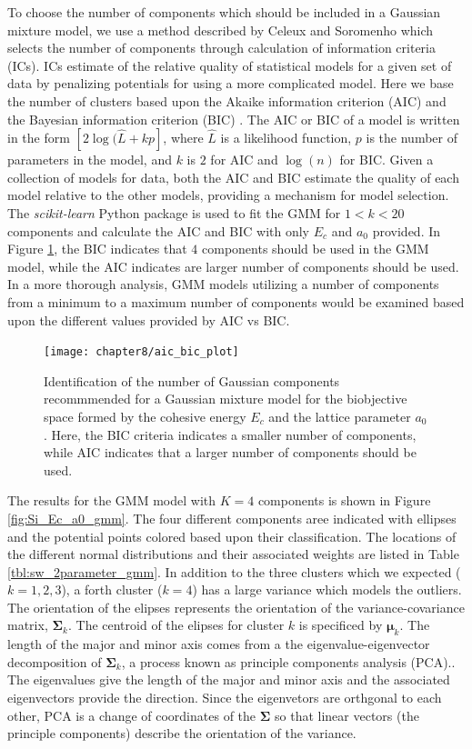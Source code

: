 To choose the number of components which should be included in a Gaussian mixture model, we use a method described by Celeux and Soromenho\cite{celeux1996_gmm_components} which selects the number of components through calculation of information criteria (ICs).  ICs estimate of the relative quality of statistical models for a given set of data by penalizing potentials for using a more complicated model.
Here we base the number of clusters based upon the Akaike information criterion (AIC)\cite{akaike1998_aic} and the Bayesian information criterion (BIC) \cite{schwarz1978_bic}.
The AIC or BIC of a model is written in the form $[2\log(\hat{L}+kp]$, where $\hat{L}$ is a likelihood function, $p$ is the number of parameters in the model, and $k$ is $2$ for AIC and $\log(n)$ for BIC.
Given a collection of models for data, both the AIC and BIC estimate the quality of each model relative to the other models, providing a mechanism for model selection.
The \emph{scikit-learn} Python package\cite{pedregosa2011_scikitlearn} is used to fit the GMM for $1 < k < 20$ components and calculate the AIC and BIC with only $E_c$ and $a_0$ provided.
In Figure \ref{fig:Si_Ec_a0_aic_bic}, the BIC indicates that $4$ components should be used in the GMM model, while the AIC indicates are larger number of components should be used.
In a more thorough analysis, GMM models utilizing a number of components from a minimum to a maximum number of components would be examined based upon the different values provided by AIC vs BIC.
\begin{figure}[ht]
	\centering
	\texttt{[image: chapter8/aic\_bic\_plot]}
	\caption{Identification of the number of Gaussian components recommmended for a Gaussian mixture model for the biobjective space formed by the cohesive energy $E_c$ and the lattice parameter $a_0$.  Here, the BIC criteria indicates a smaller number of components, while AIC indicates that a larger number of components should be used.}
	\label{fig:Si_Ec_a0_aic_bic}
\end{figure}

The results for the GMM model with $K=4$ components is shown in Figure \ref{fig:Si_Ec_a0_gmm}.  The four different components aree indicated with ellipses and the potential points colored based upon their classification.  The locations of the different normal distributions and their associated weights are listed in Table \ref{tbl:sw_2parameter_gmm}.  In addition to the three clusters which we expected ($k=1,2,3$), a forth cluster ($k=4$) has a large variance which models the outliers.  The orientation of the elipses represents the orientation of the variance-covariance matrix, $\bm{\Sigma}_k$.
The centroid of the elipses for cluster $k$ is specificed by $\bm{\mu}_k$.  The length of the major and minor axis comes from a the eigenvalue-eigenvector decomposition of $\bm{\Sigma}_k$, a process known as principle components analysis (PCA).\cite{pearson1901_pca,hotelling1933_pca}.  The eigenvalues give the length of the major and minor axis and the associated eigenvectors provide the direction.  Since the eigenvetors are orthgonal to each other, PCA is a change of coordinates of the $\bm{\Sigma}$ so that linear vectors (the principle components) describe the orientation of the variance.

